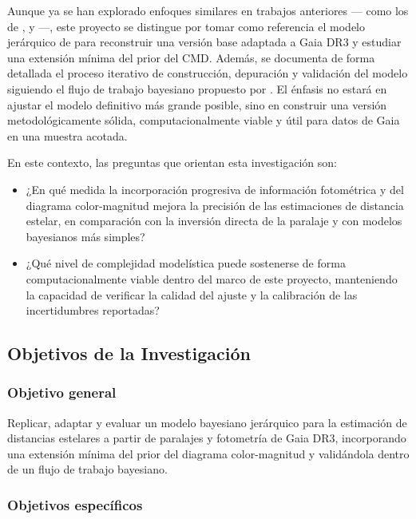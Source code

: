 \documentclass[stu, 12pt, letterpaper, donotrepeattitle, floatsintext, natbib]{apa7_ula}
\begin{document}
Aunque ya se han explorado enfoques similares en trabajos anteriores
--- como los de \citet{Anderson_2017}, \citet{Zhang_2023} y
\citet{2021AJ....161..147B} ---,
este proyecto se distingue por tomar como referencia el modelo
jerárquico de \citet{Leistedt_2017} para reconstruir una versión base
adaptada a Gaia DR3 y estudiar una extensión mínima del prior del CMD.
Además, se documenta de forma detallada el proceso iterativo de
construcción, depuración y validación del modelo siguiendo el flujo de
trabajo bayesiano propuesto por \citet{gelman2020bayesian}. El énfasis
no estará en ajustar el modelo definitivo más grande posible, sino en
construir una versión metodológicamente sólida, computacionalmente
viable y útil para datos de Gaia en una muestra acotada.

En este contexto, las preguntas que orientan esta investigación son:
\begin{itemize}
    \item ¿En qué medida la incorporación progresiva de información
    fotométrica y del diagrama color-magnitud mejora la precisión de
    las estimaciones de distancia estelar, en comparación con la
    inversión directa de la paralaje y con modelos bayesianos más
    simples?
    \item ¿Qué nivel de complejidad modelística puede sostenerse de
    forma computacionalmente viable dentro del marco de este
    proyecto, manteniendo la capacidad de verificar la calidad del
    ajuste y la calibración de las incertidumbres reportadas?
\end{itemize}

\subsection{Objetivos de la Investigación}

\subsubsection{Objetivo general}

Replicar, adaptar y evaluar un modelo bayesiano jerárquico para la
estimación de distancias estelares a partir de paralajes y fotometría
de Gaia DR3, incorporando una extensión mínima del prior del diagrama
color-magnitud y validándola dentro de un flujo de trabajo bayesiano.

\subsubsection{Objetivos específicos}
\end{document}
